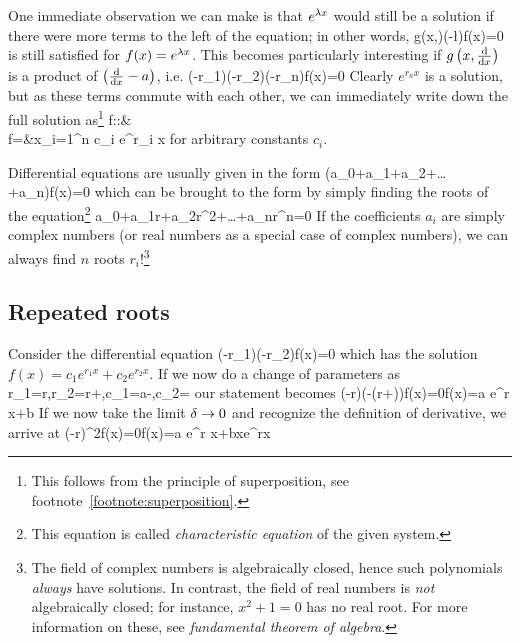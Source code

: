 One immediate observation we can make is that $e^{\lambda x}$ would still be a solution if there were more terms to the left of the equation; in other words,
\be 
g\left(x,\right)\left(-\l\right)f(x)=0
\ee 
is still satisfied for $f(x)=e^{\lambda x}$. This becomes particularly interesting if $g\left(x,\frac{\dd }{\dd x}\right)$ is a product of $\left(\frac{\dd }{\dd x}-a\right)$, i.e.
\be
\label{eq: product form diff eqn} 
\left(-r_1\right)\left(-r_2\right)\cdots\left(-r_n\right)f(x)=0
\ee 
Clearly $e^{r_nx}$ is a solution, but as these terms commute with each other, we can immediately write down the full solution as\footnote{This follows from the principle of superposition, see footnote~\ref{footnote:superposition}.}
\bea 
f::{}&{}\C\to\C\\
f={}&{}x\to \sum\limits_{i=1}^n c_i e^{r_i x}
\eea
for arbitrary constants $c_i$.

Differential equations are usually given in the form
\be 
\left(a_0+a_1+a_2+\dots+a_n\right)f(x)=0
\ee 
which can be brought to the form  by simply finding the roots of the equation\footnote{This equation is called \emph{characteristic equation} of the given system.}
\be 
a_0+a_1r+a_2r^2+\dots+a_nr^n=0
\ee 
If the coefficients $a_i$ are simply complex numbers (or real numbers as a special case of complex numbers), we can always find $n$ roots $r_i$!\footnote{
The field of complex numbers is algebraically closed, hence such polynomials \emph{always} have solutions. In contrast, the field of real numbers is \emph{not} algebraically closed; for instance, $x^2+1=0$ has no real root. For more information on these, see \emph{fundamental theorem of algebra}.
}

\subsection{Repeated roots}
Consider the differential equation
\be
\left(-r_1\right)\left(-r_2\right)f(x)=0
\ee 
which has the solution $f(x)=c_1 e^{r_1x}+c_2e^{r_2x}$. If we now do a change of parameters as
\be 
r_1=r\;,\quad r_2=r+\de\;,\quad c_1=a-\;,\quad c_2=
\ee 
our statement becomes
\be 
\left(-r\right)\left(-(r+\de)\right)f(x)=0\quad f(x)=a e^{r x}+b
\ee 
If we now take the limit $\delta\to 0$ and recognize the definition of derivative, we arrive at
\be 
\left(-r\right)^2f(x)=0\quad f(x)=a e^{r x}+bxe^{rx}
\ee 
{}


